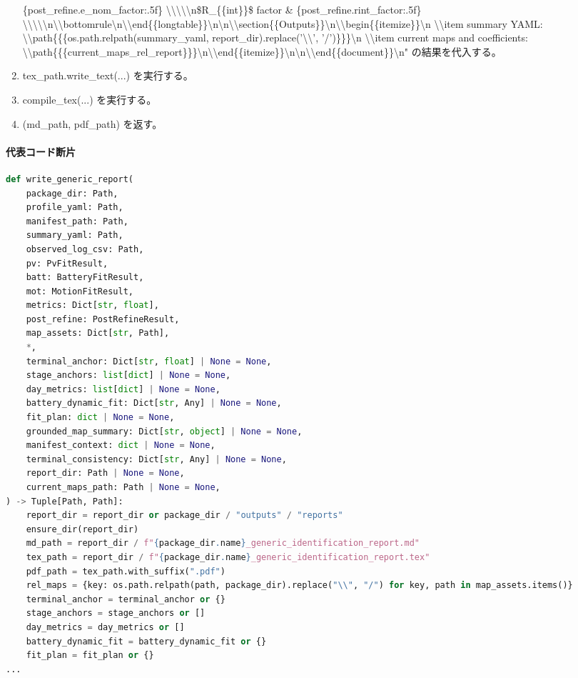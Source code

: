 \documentclass[a4paper,11pt]{article}
\begin{document}
\begin{enumerate}[leftmargin=1.8em]
\{post\_refine.e\_nom\_factor:.5f\} \textbackslash{}\textbackslash{}\textbackslash{}\textbackslash{}\textbackslash{}n\$R\_\{\{int\}\}\$ factor \& \{post\_refine.rint\_factor:.5f\} \textbackslash{}\textbackslash{}\textbackslash{}\textbackslash{}\textbackslash{}n\textbackslash{}\textbackslash{}bottomrule\textbackslash{}n\textbackslash{}\textbackslash{}end\{\{longtable\}\}\textbackslash{}n\textbackslash{}n\textbackslash{}\textbackslash{}section\{\{Outputs\}\}\textbackslash{}n\textbackslash{}\textbackslash{}begin\{\{itemize\}\}\textbackslash{}n  \textbackslash{}\textbackslash{}item summary YAML: \textbackslash{}\textbackslash{}path\{\{\{os.path.relpath(summary\_yaml, report\_dir).replace('\textbackslash{}\textbackslash{}', '/')\}\}\}\textbackslash{}n  \textbackslash{}\textbackslash{}item current maps and coefficients: \textbackslash{}\textbackslash{}path\{\{\{current\_maps\_rel\_report\}\}\}\textbackslash{}n\textbackslash{}\textbackslash{}end\{\{itemize\}\}\textbackslash{}n\textbackslash{}n\textbackslash{}\textbackslash{}end\{\{document\}\}\textbackslash{}n" の結果を代入する。
\item tex\_path.write\_text(...) を実行する。
\item compile\_tex(...) を実行する。
\item (md\_path, pdf\_path) を返す。
            \end{enumerate}
            \paragraph{代表コード断片}
            \begin{lstlisting}[language=Python]
def write_generic_report(
    package_dir: Path,
    profile_yaml: Path,
    manifest_path: Path,
    summary_yaml: Path,
    observed_log_csv: Path,
    pv: PvFitResult,
    batt: BatteryFitResult,
    mot: MotionFitResult,
    metrics: Dict[str, float],
    post_refine: PostRefineResult,
    map_assets: Dict[str, Path],
    *,
    terminal_anchor: Dict[str, float] | None = None,
    stage_anchors: list[dict] | None = None,
    day_metrics: list[dict] | None = None,
    battery_dynamic_fit: Dict[str, Any] | None = None,
    fit_plan: dict | None = None,
    grounded_map_summary: Dict[str, object] | None = None,
    manifest_context: dict | None = None,
    terminal_consistency: Dict[str, Any] | None = None,
    report_dir: Path | None = None,
    current_maps_path: Path | None = None,
) -> Tuple[Path, Path]:
    report_dir = report_dir or package_dir / "outputs" / "reports"
    ensure_dir(report_dir)
    md_path = report_dir / f"{package_dir.name}_generic_identification_report.md"
    tex_path = report_dir / f"{package_dir.name}_generic_identification_report.tex"
    pdf_path = tex_path.with_suffix(".pdf")
    rel_maps = {key: os.path.relpath(path, package_dir).replace("\\", "/") for key, path in map_assets.items()}
    terminal_anchor = terminal_anchor or {}
    stage_anchors = stage_anchors or []
    day_metrics = day_metrics or []
    battery_dynamic_fit = battery_dynamic_fit or {}
    fit_plan = fit_plan or {}
...
\end{lstlisting}
\end{document}
